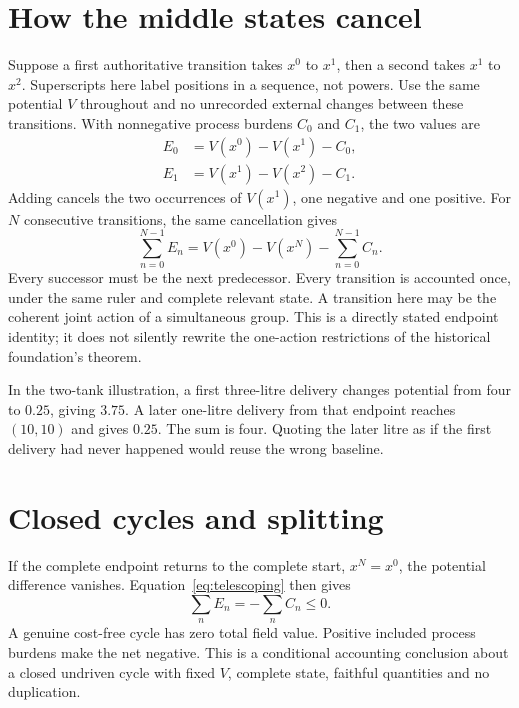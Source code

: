 \section{How the middle states cancel}
Suppose a first authoritative transition takes $x^0$ to $x^1$, then a second takes $x^1$ to $x^2$. Superscripts here label positions in a sequence, not powers. Use the same potential $V$ throughout and no unrecorded external changes between these transitions. With nonnegative process burdens $C_0$ and $C_1$, the two values are
\begin{align*}
 E_0&=V(x^0)-V(x^1)-C_0,\\
 E_1&=V(x^1)-V(x^2)-C_1.
\end{align*}
Adding cancels the two occurrences of $V(x^1)$, one negative and one positive. For $N$ consecutive transitions, the same cancellation gives
\begin{equation}\label{eq:telescoping}
 \sum_{n=0}^{N-1}E_n=V(x^0)-V(x^N)-\sum_{n=0}^{N-1}C_n.
\end{equation}
Every successor must be the next predecessor. Every transition is accounted once, under the same ruler and complete relevant state. A transition here may be the coherent joint action of a simultaneous group. This is a directly stated endpoint identity; it does not silently rewrite the one-action restrictions of the historical foundation's theorem.\cite{bridge,foundation}

In the two-tank illustration, a first three-litre delivery changes potential from four to $0.25$, giving $3.75$. A later one-litre delivery from that endpoint reaches $(10,10)$ and gives $0.25$. The sum is four. Quoting the later litre as if the first delivery had never happened would reuse the wrong baseline.

\section{Closed cycles and splitting}
If the complete endpoint returns to the complete start, $x^N=x^0$, the potential difference vanishes. Equation~\eqref{eq:telescoping} then gives
\begin{equation}\label{eq:cycle}
 \sum_n E_n=-\sum_n C_n\leq0.
\end{equation}
A genuine cost-free cycle has zero total field value. Positive included process burdens make the net negative. This is a conditional accounting conclusion about a closed undriven cycle with fixed $V$, complete state, faithful quantities and no duplication.

